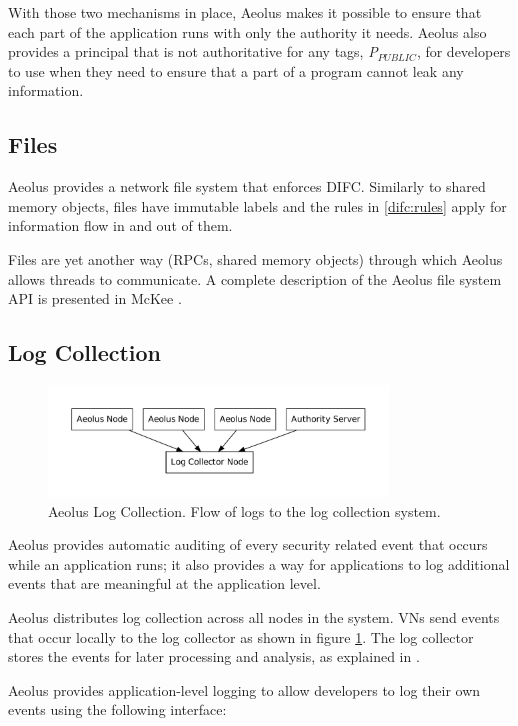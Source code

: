 With those two mechanisms in place, Aeolus makes it possible to ensure that each part of the application runs with only the authority it needs. Aeolus also provides a principal that is not authoritative for any tags, \emph{P$_{PUBLIC}$}, for developers to use when they need to ensure that a part of a program cannot leak any information.

\subsection{Files}

Aeolus provides a network file system that enforces DIFC. Similarly to shared memory objects, files have immutable labels and the rules in \ref{difc:rules} apply for information flow in and out of them.

Files are yet another way (RPCs, shared memory objects) through which Aeolus allows threads to communicate. A complete description of the Aeolus file system API is presented in McKee \cite{mckee}.

\subsection{Log Collection}
\label{aeolus:logging}

\begin{figure}[h]
\centering
\includegraphics[height=8em]{figures/event-logging-overview}
\caption[Aeolus Log Collection]{Aeolus Log Collection. Flow of logs to the log collection system.}
\label{fig:log-flow}
\end{figure}

Aeolus provides automatic auditing of every security related event that occurs while an application runs; it also provides a way for applications to log additional events that are meaningful at the application level.

Aeolus distributes log collection across all nodes in the system. VNs send events that occur locally to the log collector as shown in figure \ref{fig:log-flow}. The log collector stores the events for later processing and analysis, as explained in \cite{blanks}.

Aeolus provides application-level logging to allow developers to log their own events using the following interface:

